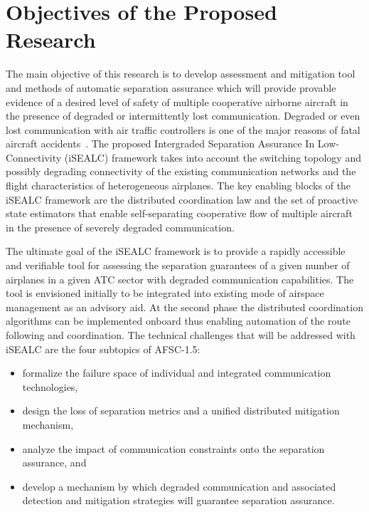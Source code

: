 \documentclass[letter,onecolumn,12pt]{aiaa-tc}
\newcommand{\1}{1_n}
\begin{document}
\section{Objectives of the Proposed Research}

The main objective of this research is to develop assessment and mitigation tool and methods of automatic separation assurance which will provide provable evidence of a desired level of safety of multiple cooperative airborne aircraft in the presence of degraded or intermittently lost communication. Degraded or even lost communication with air traffic controllers is one of the major reasons of fatal aircraft accidents~\cite{Kochenderfer_2012}. The proposed  Intergraded Separation Assurance In Low-Connectivity (iSEALC) framework takes into account the switching topology and possibly degrading connectivity of the existing communication networks and the flight characteristics of heterogeneous airplanes. The key enabling blocks of the iSEALC framework are the distributed coordination law and the set of proactive state estimators that enable self-separating cooperative flow of multiple aircraft in the presence of severely degraded communication.

The ultimate goal of the iSEALC framework is to provide a rapidly accessible and verifiable tool for assessing the separation guarantees of a given number of airplanes in a given ATC sector with degraded communication capabilities.  The tool is  envisioned initially to be integrated into existing mode of airspace management as an advisory aid. At the second phase the distributed coordination algorithms can be implemented onboard thus enabling automation of the route following and coordination. The technical challenges that will be addressed with iSEALC are the four subtopics of AFSC-1.5:
\vspace{-2mm}
\begin{itemize}
\setlength{\itemsep}{-4pt}
    \item formalize the failure space of individual and integrated communication technologies,
    \item design the loss of separation metrics and a unified distributed mitigation mechanism,
    \item analyze the impact of  communication constraints onto the separation assurance, and
    \item develop a mechanism by which degraded communication and associated detection and mitigation strategies will guarantee separation assurance.
\end{itemize}
\vspace{-2mm}
\end{document}
